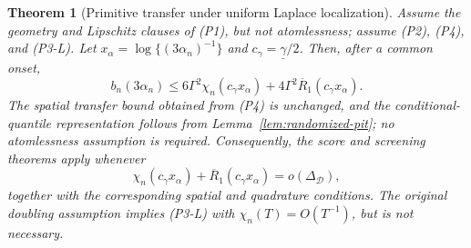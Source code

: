 \documentclass[11pt]{article}
\newtheorem{theorem}{Theorem}[section]
\theoremstyle{definition}\newtheorem{definition}[theorem]{Definition}
\newcommand{\D}{\mathcal D}
\begin{document}
\begin{theorem}[Primitive transfer under uniform Laplace localization]
\label{thm:laplace-transfer}
Assume the geometry and Lipschitz clauses of (P1), but not atomlessness;
assume (P2), (P4), and (P3-L).  Let
$x_\alpha=\log\{(3\alpha_n)^{-1}\}$ and
$c_\gamma=\underline\gamma/2$.  Then, after a common onset,
\begin{equation}
 b_n(3\alpha_n)
 \le6\Gamma^2\chi_n(c_\gamma x_\alpha)
   +4\Gamma^2\overline R_1(c_\gamma x_\alpha).
 \label{eq:laplace-E2}
\end{equation}
The spatial transfer bound obtained from (P4) is unchanged, and the
conditional-quantile representation follows from
Lemma~\ref{lem:randomized-pit}; no atomlessness assumption is required.
Consequently, the score and screening theorems apply whenever
\begin{equation}
 \chi_n(c_\gamma x_\alpha)
 +\overline R_1(c_\gamma x_\alpha)
 =o(\Delta_{\D}),
 \label{eq:laplace-rate}
\end{equation}
together with the corresponding spatial and quadrature conditions.
The original doubling assumption implies (P3-L) with
$\chi_n(T)=O(T^{-1})$, but is not necessary.
\end{theorem}
\end{document}
